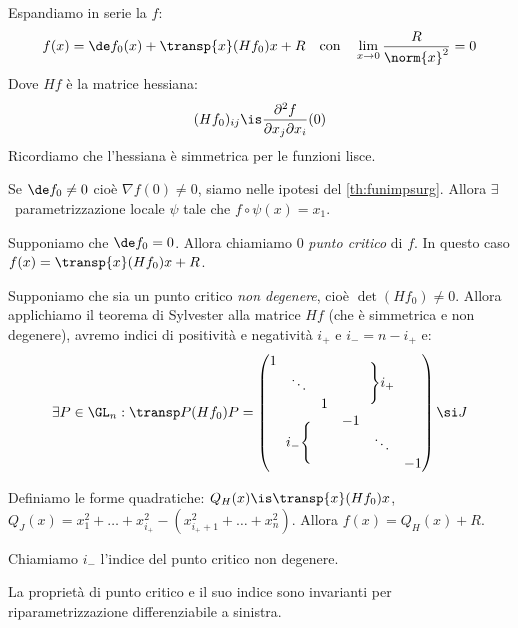 Espandiamo in serie la $f$:
\[f(x)=
\de f_{0}(x)+\transp{x}(Hf_{0})x+R
\quad\text{con}\quad
\lim_{x\to0}\frac R{\norm{x}^2}=0\]
Dove $Hf$ è la matrice hessiana:
\[(Hf_{0})_{ij}\is
\frac{\partial^2f}{\partial x_j\partial x_i}(0)\]
Ricordiamo che l'hessiana è simmetrica per le funzioni lisce.

Se $\de f_{0}\neq0$ cioè $\nabla f(0)\neq0$, siamo nelle ipotesi del \autoref{th:funimpsurg}. Allora $\exists$~parametrizzazione locale $\psi$ tale che $f\circ\psi(x)=x_1$.

Supponiamo che $\de f_{0}=0$. Allora chiamiamo $0$ \emph{punto critico} di $f$. In questo caso $f(x)=\transp{x}(Hf_{0})x+R$.

Supponiamo che sia un punto critico \emph{non degenere}, cioè $\det(Hf_{0})\neq0$. Allora applichiamo il teorema di Sylvester alla matrice $Hf$ (che è simmetrica e non degenere), avremo indici di positività e negatività $i_+$ e $i_-=n-i_+$ e:
\[\exists P\in\GL_n:
\transp P(Hf_{0})P=
\begin{pmatrix}
	\begin{matrix}
		1 & & \\
		& \ddots & \\
		& & 1 \\
	\end{matrix} & \Bigg\}i_+ \\
	i_-\Bigg\{ & \begin{matrix}
		-1 & & \\
		& \ddots & \\
		& & -1 \\
	\end{matrix}
\end{pmatrix}\si J\]

Definiamo le forme quadratiche: $Q_H(x)\is\transp{x}(Hf_{0})x$, $Q_J(x)=x_1^2+\dots+x_{i_+}^2-(x_{i_++1}^2+\dots+x_n^2)$. Allora $f(x)=Q_H(x)+R$.

Chiamiamo $i_-$ l'indice del punto critico non degenere.

\begin{ex}
	La proprietà di punto critico e il suo indice sono invarianti per riparametrizzazione differenziabile a sinistra.
\end{ex}

